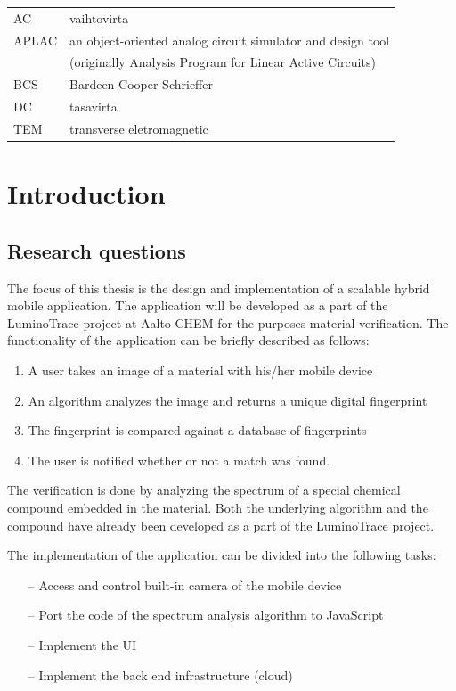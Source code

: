 \documentclass[english,12pt,a4paper,pdftex]{article}
\begin{document}
\begin{tabular}{ll}
AC         & vaihtovirta \\
APLAC      & an object-oriented analog circuit simulator and design tool \\
           & (originally Analysis Program for Linear Active Circuits) \\
BCS        & Bardeen-Cooper-Schrieffer \\ %
DC         & tasavirta \\
TEM        & transverse eletromagnetic
\end{tabular}

\cleardoublepage
\storeinipagenumber
{}
\setcounter{page}{1}


\section{Introduction}
\subsection{Research questions}

\thispagestyle{empty}
The focus of this thesis is the design and implementation of a scalable hybrid mobile application. The application will be developed as a part of the LuminoTrace project at Aalto CHEM for the purposes material verification. The functionality of the application can be briefly described as follows:

\begin{enumerate}
\item A user takes an image of a material with his/her mobile device
\item An algorithm analyzes the image and returns a unique digital fingerprint
\item The fingerprint is compared against a database of fingerprints
\item The user is notified whether or not a match was found.
\end{enumerate}

The verification is done by analyzing the spectrum of a special chemical compound embedded in the material. Both the underlying algorithm and the compound have already been developed as a part of the LuminoTrace project.

The implementation of the application can be divided into the following tasks:

\begin{itemize}
\item[--]Access and control built-in camera of the mobile device
\item[--]Port the code of the spectrum analysis algorithm to JavaScript
\item[--]Implement the UI
\item[--]Implement the back end infrastructure (cloud)
\end{itemize}
\end{document}
